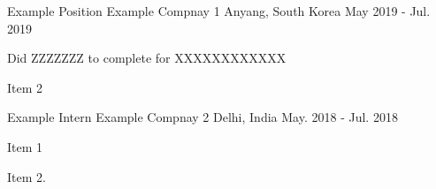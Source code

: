 

\begin{cventries}

  \cventry
    {Example Position} %
    {Example Compnay 1} %
    {Anyang, South Korea} %
    {May 2019 - Jul. 2019} %
    {
      \begin{cvitems} %
        \item {Did ZZZZZZZ to complete  for XXXXXXXXXXXX}
    \item {Item 2}
      \end{cvitems}
    }

  \cventry
    {Example Intern} %
    {Example Compnay 2} %
    {Delhi, India} %
    {May. 2018 - Jul. 2018} %
    {
      \begin{cvitems} %
        \item {Item 1}
        \item {Item 2.}
      \end{cvitems}
    }

\end{cventries}
